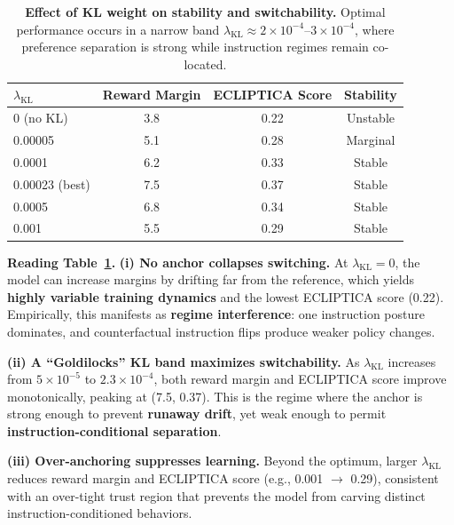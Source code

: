 \begin{table}[H]
\centering
\small
\renewcommand{\arraystretch}{1.2}
\begin{tabular}{@{}lccc@{}}
\toprule
\textbf{$\lambda_{\text{KL}}$} & \textbf{Reward Margin} & \textbf{ECLIPTICA Score} & \textbf{Stability} \\
\midrule
0 (no KL) & 3.8 & 0.22 & Unstable \\ \hline
0.00005 & 5.1 & 0.28 & Marginal \\ \hline
0.0001 & 6.2 & 0.33 & Stable \\ \hline
0.00023 (best) & 7.5 & 0.37 & Stable \\ \hline
0.0005 & 6.8 & 0.34 & Stable \\ \hline
0.001 & 5.5 & 0.29 & Stable \\
\bottomrule
\end{tabular}
\caption{\textbf{Effect of KL weight on stability and switchability.} Optimal performance occurs in a narrow band $\lambda_{\text{KL}}\approx 2\times 10^{-4}$--$3\times 10^{-4}$, where preference separation is strong while instruction regimes remain co-located.}
\label{tab:kl_ablation}
\end{table}

\vspace{-0.35em}
\noindent\textbf{Reading Table~\ref{tab:kl_ablation}.}
\textbf{(i) No anchor collapses switching.}
At $\lambda_{\text{KL}}=0$, the model can increase margins by drifting far from the reference, which yields \textbf{highly variable training dynamics} and the lowest ECLIPTICA score (0.22).
Empirically, this manifests as \textbf{regime interference}: one instruction posture dominates, and counterfactual instruction flips produce weaker policy changes.

\vspace{-0.25em}
\noindent
\textbf{(ii) A ``Goldilocks'' KL band maximizes switchability.}
As $\lambda_{\text{KL}}$ increases from $5\times 10^{-5}$ to $2.3\times 10^{-4}$, both reward margin and ECLIPTICA score improve monotonically, peaking at (7.5, 0.37).
This is the regime where the anchor is strong enough to prevent \textbf{runaway drift}, yet weak enough to permit \textbf{instruction-conditional separation}.

\vspace{-0.25em}
\noindent
\textbf{(iii) Over-anchoring suppresses learning.}
Beyond the optimum, larger $\lambda_{\text{KL}}$ reduces reward margin and ECLIPTICA score (e.g., 0.001 $\rightarrow$ 0.29), consistent with an over-tight trust region that prevents the model from carving distinct instruction-conditioned behaviors.

